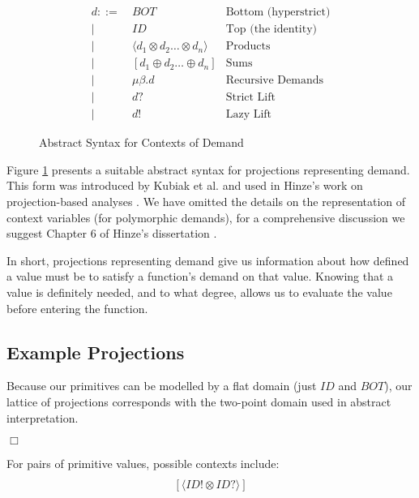 \begin{figure}
\begin{align*}
    d ::=&\ BOT              & \text{Bottom (hyperstrict)} \\
        |&\ ID               & \text{Top (the identity)} \\
        |&\ \langle d_{1} \otimes d_{2} \dots \otimes d_{n} \rangle   & \text{Products} \\ 
        |&\ [d_{1} \oplus d_{2} \dots \oplus d_{n}]    & \text{Sums} \\ 
        |&\ \mu\beta . d     & \text{Recursive Demands} \\
        |&\ d?               & \text{Strict Lift} \\
        |&\ d!               & \text{Lazy Lift}
\end{align*}
\caption{Abstract Syntax for Contexts of Demand}
\label{fig:ContextAST}
\end{figure}


Figure \ref{fig:ContextAST} presents a suitable abstract syntax for projections
representing demand.  This form was introduced by Kubiak et al. and used in
Hinze's work on projection-based analyses \citep{kubiak, hinze1995projection}.
We have omitted the details on the representation of context variables (for
polymorphic demands), for a comprehensive discussion we suggest Chapter 6 of Hinze's
dissertation \citep{hinze1995projection}.

In short, projections representing demand give us information about how defined
a value must be to satisfy a function's demand on that value. Knowing that a
value is definitely needed, and to what degree, allows us to evaluate the value
before entering the function.

\subsection*{Example Projections}

Because our primitives can be modelled by a flat domain (just $ID$ and $BOT$),
our lattice of projections corresponds with the two-point domain used in
abstract interpretation.

\hfill$\Box$

For pairs of primitive values, possible contexts include:
\begin{align}
[\langle ID? \otimes ID? \rangle] \label{IDPairs} \\
[\langle ID! \otimes ID? \rangle] \label{FSTPairs}
\end{align}


